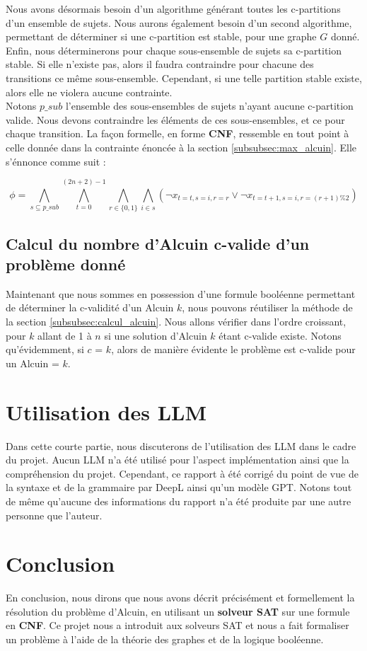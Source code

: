 \documentclass{article}
\begin{document}
\noindent Nous avons désormais besoin d'un algorithme générant toutes les c-partitions d'un ensemble de sujets. Nous aurons également besoin d'un second algorithme, permettant de déterminer si une c-partition est stable, pour une graphe $G$ donné. Enfin, nous déterminerons pour chaque sous-ensemble de sujets sa c-partition stable. Si elle n'existe pas, alors il faudra contraindre pour chacune des transitions ce même sous-ensemble. Cependant, si une telle partition stable existe, alors elle ne violera aucune contrainte. \\

\noindent Notons $p\_sub$ l'ensemble des sous-ensembles de sujets n'ayant aucune c-partition valide. Nous devons contraindre les éléments de ces sous-ensembles, et ce pour chaque transition. La façon formelle, en forme \textbf{CNF}, ressemble en tout point à celle donnée dans la contrainte énoncée à la section \ref{subsubsec:max_alcuin}. Elle s'énnonce comme suit :

\[
\phi =
\bigwedge_{s \subseteq p\_sub}
\bigwedge_{t=0}^{(2n+2) - 1}
\bigwedge_{r \in \{0, 1\}}
\bigwedge_{i \in s}
\left(
\lnot x_{t=t, s=i, r=r} \lor
\lnot x_{t=t+1, s=i, r=(r+1) \% 2}
\right)
\]

\subsection{Calcul du nombre d'Alcuin c-valide d'un problème donné}

\noindent Maintenant que nous sommes en possession d'une formule booléenne permettant de déterminer la c-validité d'un Alcuin $k$, nous pouvons réutiliser la méthode de la section \ref{subsubsec:calcul_alcuin}. Nous allons vérifier dans l'ordre croissant, pour $k$ allant de 1 à $n$ si une solution d'Alcuin $k$ étant c-valide existe. Notons qu'évidemment, si $c$ = $k$, alors de manière évidente le problème est c-valide pour un Alcuin = $k$.

\section{Utilisation des LLM}

\noindent Dans cette courte partie, nous discuterons de l'utilisation des LLM dans le cadre du projet. Aucun LLM n'a été utilisé pour l'aspect implémentation ainsi que la compréhension du projet. Cependant, ce rapport à été corrigé du point de vue de la syntaxe et de la grammaire par DeepL ainsi qu'un modèle GPT. Notons tout de même qu'aucune des informations du rapport n'a été produite par une autre personne que l'auteur.

\section{Conclusion}

\noindent En conclusion, nous dirons que nous avons décrit précisément et formellement la résolution du problème d'Alcuin, en utilisant un \textbf{solveur SAT} sur une formule en \textbf{CNF}. Ce projet nous a introduit aux solveurs SAT et nous a fait formaliser un problème à l'aide de la théorie des graphes et de la logique booléenne.
\end{document}
